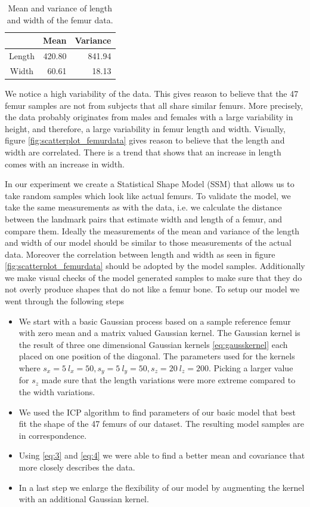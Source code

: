 \documentclass[10pt]{article}
\theoremstyle{definition}
\begin{document}
\begin{table}[h!]
\centering
\begin{tabular}{c|r|r}
 & Mean & Variance \\
\hline
Length & 420.80 & 841.94 \\
Width & 60.61 & 18.13
\end{tabular}
\caption{Mean and variance of length and width of the femur data.}
\label{table:mean_variance_femur_data}
\end{table}

We notice a high variability of the data. This gives reason to believe that the 47 femur samples are not from subjects that all share similar femurs. More precisely, the data probably originates from males and females with a large variability in height, and therefore, a large variability in femur length and width. Visually, figure \ref{fig:scatterplot_femurdata} gives reason to believe that the length and width are correlated. There is a trend that shows that an increase in length comes with an increase in width.

In our experiment we create a Statistical Shape Model (SSM) that allows us to take random samples which look like actual femurs. To validate the model, we take the same measurements as with the data, i.e. we calculate the distance between the landmark pairs that estimate width and length of a femur, and compare them. Ideally the measurements of the mean and variance of the length and width of our model should be similar to those measurements of the actual data. Moreover the correlation between length and width as seen in figure \ref{fig:scatterplot_femurdata} should be adopted by the model samples. Additionally we make visual checks of the model generated samples to make sure that they do not overly produce shapes that do not like a femur bone. To setup our model we went through the following steps
\begin{itemize}
\item
We start with a basic Gaussian process based on a sample reference femur with zero mean and a matrix valued Gaussian kernel. The Gaussian kernel is the result of three one dimensional Gaussian kernels \eqref{eq:gausskernel} each placed on one position of the diagonal. The parameters used for the kernels where $s_x= 5\ l_x= 50, s_y=5\ l_y=50, s_z=20 \ l_z = 200$. Picking a larger value for $s_z$ made sure that the length variations were more extreme compared to the width variations.
\item We used the ICP algorithm to find parameters of our basic model that best fit the shape of the 47 femurs of our dataset. The resulting model samples are in correspondence.
\item Using \eqref{eq:3} and \eqref{eq:4} we were able to find a better mean and covariance that more closely describes the data.
\item In a last step we enlarge the flexibility of our model by augmenting the kernel with an additional Gaussian kernel.

\end{itemize}
\end{document}
